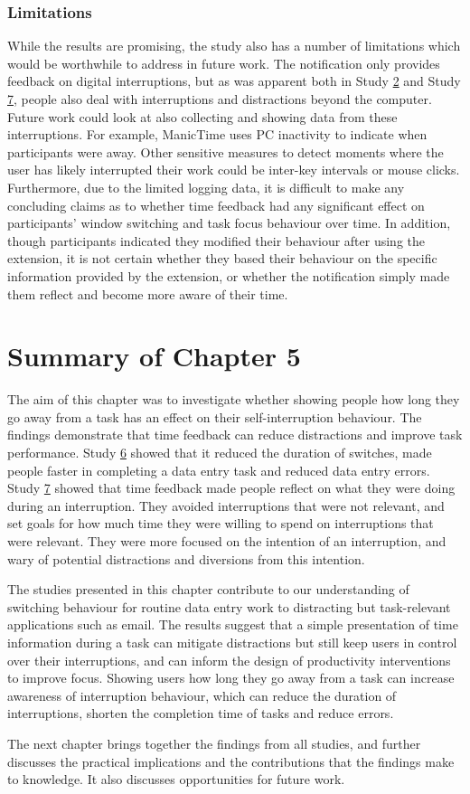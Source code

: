 \subsubsection{Limitations}
While the results are promising, the study also has a number of limitations which would be worthwhile to address in future work. The notification only provides feedback on digital interruptions, but as was apparent both in Study \hyperref[st:Study2]{2} and Study \hyperref[st:Study7]{7}, people also deal with interruptions and distractions beyond the computer. Future work could look at also collecting and showing data from these interruptions. For example, ManicTime uses PC inactivity to indicate when participants were away. Other sensitive measures to detect moments where the user has likely interrupted their work could be inter-key intervals or mouse clicks. Furthermore, due to the limited logging data, it is difficult to make any concluding claims as to whether time feedback had any significant effect on participants’ window switching and task focus behaviour over time. In addition, though participants indicated they modified their behaviour after using the extension, it is not certain whether they based their behaviour on the specific information provided by the extension, or whether the notification simply made them reflect and become more aware of their time. 

\section{Summary of Chapter 5}
The aim of this chapter was to investigate whether showing people how long they go away from a task has an effect on their self-interruption behaviour. The findings demonstrate that time feedback can reduce distractions and improve task performance. Study \hyperref[st:Study6]{6} showed that it reduced the duration of switches, made people faster in completing a data entry task and reduced data entry errors. Study \hyperref[st:Study7]{7} showed that time feedback made people reflect on what they were doing during an interruption. They avoided interruptions that were not relevant, and set goals for how much time they were willing to spend on interruptions that were relevant. They were more focused on the intention of an interruption, and wary of potential distractions and diversions from this intention. 

The studies presented in this chapter contribute to our understanding of switching behaviour for routine data entry work to distracting but task-relevant applications such as email. The results suggest that a simple presentation of time information during a task can mitigate distractions but still keep users in control over their interruptions, and can inform the design of productivity interventions to improve focus. Showing users how long they go away from a task can increase awareness of interruption behaviour, which can reduce the duration of interruptions, shorten the completion time of tasks and reduce errors.

The next chapter brings together the findings from all studies, and further discusses the practical implications and the contributions that the findings make to knowledge. It also discusses opportunities for future work.
